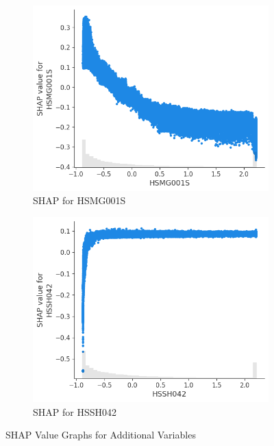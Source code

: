 \documentclass{article}
\begin{document}
\begin{figure}[H]
  \begin{subfigure}{0.45\textwidth}
    \includegraphics[width=\linewidth]{figures/HSMG001S_SHAP.png}
    \caption{SHAP for HSMG001S}
  \end{subfigure}
  \hfill
  \begin{subfigure}{0.45\textwidth}
    \includegraphics[width=\linewidth]{figures/HSSH042_SHAP.png}
    \caption{SHAP for HSSH042}
  \end{subfigure}
  
  \caption{SHAP Value Graphs for Additional Variables}
\end{figure}
\end{document}
